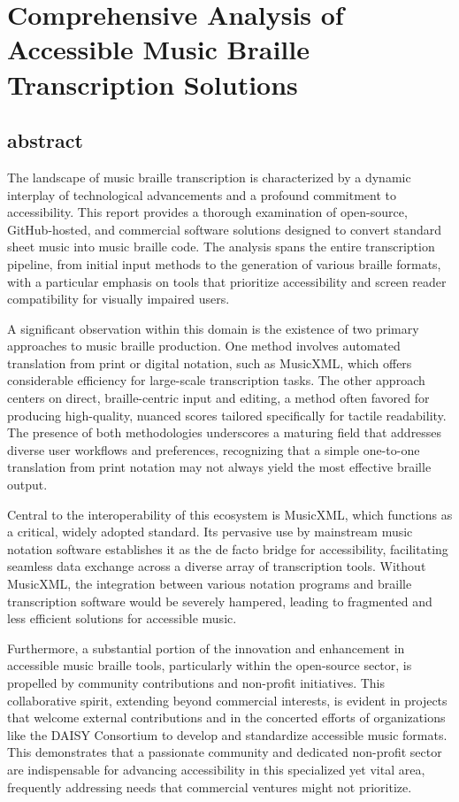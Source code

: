 \chapter{Comprehensive Analysis of Accessible Music Braille Transcription Solutions}

\section{abstract}
The landscape of music braille transcription is characterized by a dynamic interplay of technological advancements and a profound commitment to accessibility. This report provides a thorough examination of open-source, GitHub-hosted, and commercial software solutions designed to convert standard sheet music into music braille code. The analysis spans the entire transcription pipeline, from initial input methods to the generation of various braille formats, with a particular emphasis on tools that prioritize accessibility and screen reader compatibility for visually impaired users.

A significant observation within this domain is the existence of two primary approaches to music braille production. One method involves automated translation from print or digital notation, such as MusicXML, which offers considerable efficiency for large-scale transcription tasks. The other approach centers on direct, braille-centric input and editing, a method often favored for producing high-quality, nuanced scores tailored specifically for tactile readability. The presence of both methodologies underscores a maturing field that addresses diverse user workflows and preferences, recognizing that a simple one-to-one translation from print notation may not always yield the most effective braille output.

Central to the interoperability of this ecosystem is MusicXML, which functions as a critical, widely adopted standard. Its pervasive use by mainstream music notation software establishes it as the de facto bridge for accessibility, facilitating seamless data exchange across a diverse array of transcription tools. Without MusicXML, the integration between various notation programs and braille transcription software would be severely hampered, leading to fragmented and less efficient solutions for accessible music.\cite{MusicAccessibilityResources}

Furthermore, a substantial portion of the innovation and enhancement in accessible music braille tools, particularly within the open-source sector, is propelled by community contributions and non-profit initiatives. This collaborative spirit, extending beyond commercial interests, is evident in projects that welcome external contributions and in the concerted efforts of organizations like the DAISY Consortium to develop and standardize accessible music formats. This demonstrates that a passionate community and dedicated non-profit sector are indispensable for advancing accessibility in this specialized yet vital area, frequently addressing needs that commercial ventures might not prioritize.\cite{DAISYDevelopments}


